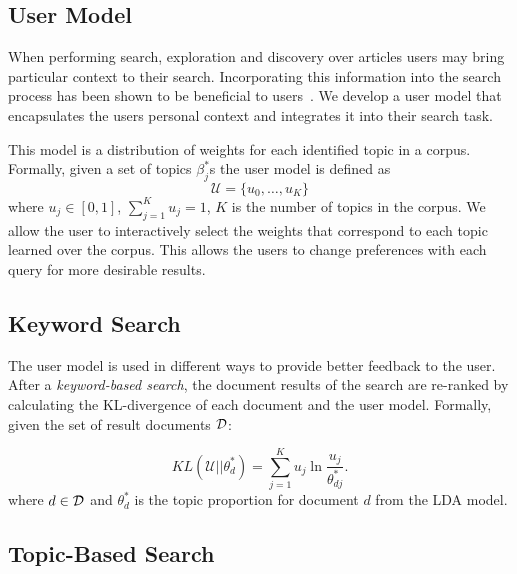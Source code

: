 \subsection{User Model}
When performing search, exploration and discovery over articles 
users may bring particular context to their search. Incorporating 
this information into the search process has been shown to be 
beneficial to users~\cite{DZSRWJ,MZPGSOL}. We develop a user model 
that encapsulates the users personal context and integrates it into 
their search task. 

This model is a distribution of weights for each identified topic in 
a corpus. Formally, given a set of topics $\beta_j^{*}$s the user 
model is defined as
$$
\mathcal{U} = \{u_0, \ldots, u_{K}\}
$$
where $u_j \in [0,1]$, $\sum_{j = 1}^K u_j = 1$, $K$ is the number 
of topics in the corpus.
We allow the user to interactively select the weights that correspond to
each topic learned over the corpus. This allows the users to change preferences with each query
for more desirable results.

\subsection{Keyword Search}
The user model is used in different ways to provide better feedback to
the user. After a \textsl{keyword-based search}, the document results of the search 
are re-ranked by calculating the KL-divergence of each document and the
user model. Formally, given the set of result documents $\cal D$:

\begin{equation} \label{eq:KL}
KL(\mathcal{U}||\theta^*_{d}) = \sum_{j = 1}^K u_j \ln \frac{u_j}{\theta^*_{dj}}.
\end{equation}
where $d \in {\cal D}$ and $\theta^*_{d}$ is the topic proportion 
for document $d$ from the LDA model. 


\subsection{Topic-Based Search}


